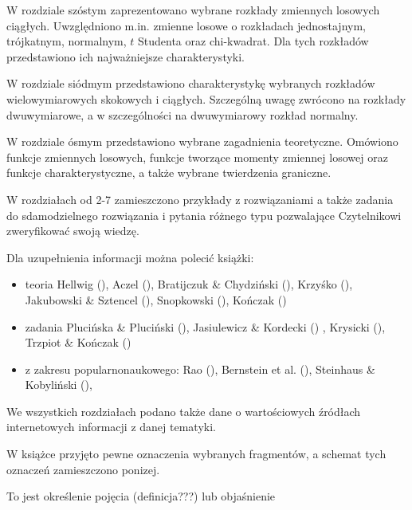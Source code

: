 \documentclass[
  letterpaper,
  DIV=11,
  numbers=noendperiod]{scrreprt}
\begin{document}
W rozdziale szóstym zaprezentowano wybrane rozkłady zmiennych losowych
ciągłych. Uwzględniono m.in. zmienne losowe o rozkładach jednostajnym,
trójkatnym, normalnym, \(t\) Studenta oraz chi-kwadrat. Dla tych
rozkładów przedstawiono ich najważniejsze charakterystyki.

W rozdziale siódmym przedstawiono charakterystykę wybranych rozkładów
wielowymiarowych skokowych i ciągłych. Szczególną uwagę zwrócono na
rozkłady dwuwymiarowe, a w szczególności na dwuwymiarowy rozkład
normalny.

W rozdziale ósmym przedstawiono wybrane zagadnienia teoretyczne.
Omówiono funkcje zmiennych losowych, funkcje tworzące momenty zmiennej
losowej oraz funkcje charakterystyczne, a także wybrane twierdzenia
graniczne.

W rozdziałach od 2-7 zamieszczono przykłady z rozwiązaniami a także
zadania do sdamodzielnego rozwiązania i pytania różnego typu pozwalające
Czytelnikowi zweryfikować swoją wiedzę.

Dla uzupełnienia informacji można polecić książki:

\begin{itemize}
\item
  teoria Hellwig (), Aczel
  (), Bratijczuk \& Chydziński
  (), Krzyśko
  (), Jakubowski \& Sztencel
  (), Snopkowski
  (), Kończak
  ()
\item
  zadania Plucińska \& Pluciński (),
  Jasiulewicz \& Kordecki () ,
  Krysicki (), Trzpiot \& Kończak
  ()
\item
  z zakresu popularnonaukowego: Rao (),
  Bernstein et al. (), Steinhaus \&
  Kobyliński (),
\end{itemize}

We wszystkich rozdziałach podano także dane o wartościowych źródłach
internetowych informacji z danej tematyki.

W książce przyjęto pewne oznaczenia wybranych fragmentów, a schemat tych
oznaczeń zamieszczono ponizej.

\begin{tcolorbox}[enhanced jigsaw, toprule=.15mm, title=\textcolor{quarto-callout-note-color}{\faInfo}\hspace{0.5em}{Określenia pojęć, objaśnienia lub definicje}, breakable, coltitle=black, titlerule=0mm, colbacktitle=quarto-callout-note-color!10!white, opacitybacktitle=0.6, opacityback=0, bottomtitle=1mm, left=2mm, arc=.35mm, leftrule=.75mm, bottomrule=.15mm, rightrule=.15mm, toptitle=1mm, colframe=quarto-callout-note-color-frame, colback=white]

To jest określenie pojęcia (definicja???) lub objaśnienie

\end{tcolorbox}
\end{document}
